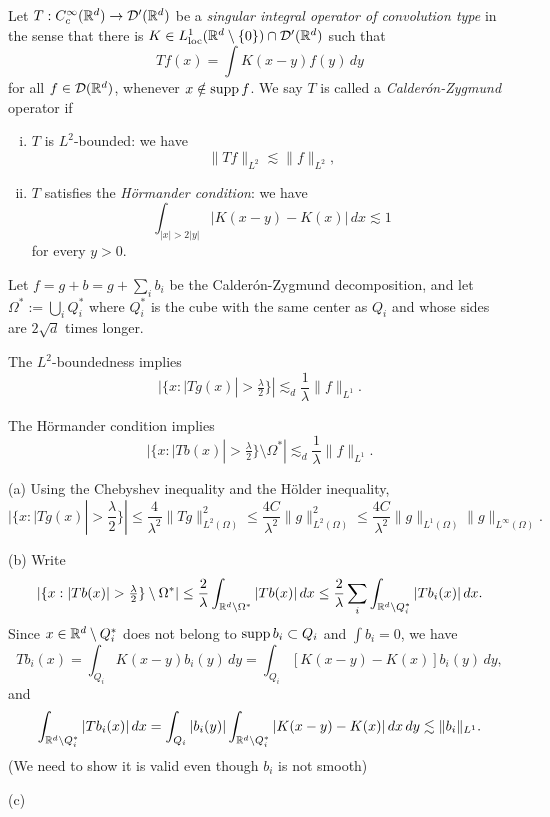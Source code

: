 \documentclass{../../large}
\begin{document}
\begin{prb}
Let $T:C_c^\infty(\mathbb{R}^d)\to\mathcal{D}'(\mathbb{R}^d)$ be a \emph{singular integral operator of convolution type} in the sense that there is $K\in L_{\mathrm{loc}}^1(\mathbb{R}^d\setminus\{0\})\cap\mathcal{D}'(\mathbb{R}^d)$ such that
\[Tf(x)=\int K(x-y)f(y)\,dy\]
for all $f\in\mathcal{D}(\mathbb{R}^d)$, whenever $x\notin\operatorname{supp} f$.
We say $T$ is called a \emph{Calder\'on-Zygmund} operator if
\begin{enumerate}[(i)]
\item $T$ is $L^2$-bounded: we have
\[\|Tf\|_{L^2}\lesssim\|f\|_{L^2},\]
\item $T$ satisfies the \emph{H\"ormander condition}: we have
\[\int_{|x|>2|y|}|K(x-y)-K(x)|\,dx\lesssim1\]
for every $y>0$.
\end{enumerate}

Let $f=g+b=g+\sum_ib_i$ be the Calder\'on-Zygmund decomposition, and let $\Omega^*:=\bigcup_iQ_i^*$ where $Q_i^*$ is the cube with the same center as $Q_i$ and whose sides are $2\sqrt d$ times longer. 
\begin{parts}
\item
The $L^2$-boundedness implies
\[|\{x:|Tg(x)|>\tfrac\lambda2\}|\lesssim_d\frac1\lambda\|f\|_{L^1}.\]
\item
The H\"ormander condition implies
\[|\{x:|Tb(x)|>\tfrac\lambda2\}\setminus\Omega^*|\lesssim_d\frac1\lambda\|f\|_{L^1}.\]
\item
\end{parts}
\end{prb}
\begin{pf}
(a)
Using the Chebyshev inequality and the H\"older inequality,
\[|\{x:|Tg(x)|>\frac\lambda2\}|
\le\frac4{\lambda^2}\|Tg\|_{L^2(\Omega)}^2
\le\frac{4C}{\lambda^2}\|g\|_{L^2(\Omega)}^2
\le\frac{4C}{\lambda^2}\|g\|_{L^1(\Omega)}\|g\|_{L^\infty(\Omega)}.
\]

(b)
Write
\[|\{x:|Tb(x)|>\tfrac\lambda2\}\setminus\Omega^*|
\le\frac2\lambda\int_{\R^d\setminus\Omega^*}|Tb(x)|\,dx
\le\frac2\lambda\sum_i\int_{\R^d\setminus Q_i^*}|Tb_i(x)|\,dx.\]
Since $x\in\mathbb{R}^d\setminus Q_i^*$ does not belong to $\operatorname{supp} b_i\subset Q_i$ and $\int b_i=0$, we have
\[Tb_i(x)=\int_{Q_i}K(x-y)b_i(y)\,dy=\int_{Q_i}[K(x-y)-K(x)]b_i(y)\,dy,\]
and
\[\int_{\mathbb{R}^d\setminus Q_i^*}|Tb_i(x)|\,dx
=\int_{Q_i}|b_i(y)|\int_{\mathbb{R}^d\setminus Q_i^*}|K(x-y)-K(x)|\,dx\,dy
\lesssim\|b_i\|_{L^1}.\]
(We need to show it is valid even though $b_i$ is not smooth)

(c)

\end{pf}
\end{document}
